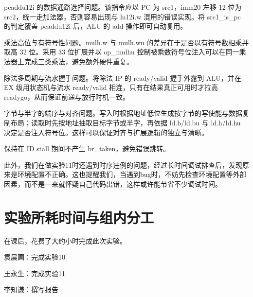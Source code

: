 \documentclass[11pt]{article}
\begin{document}
pcaddu12i 的数据通路选择问题。该指令应以 PC 为 src1，imm20 左移 12 位为 src2，统一走加法器，否则容易出现与 lu12i.w 混用的错误实现。将 src1\_is\_pc 的判定覆盖 pcaddu12i 后，ALU 的 add 操作即可自动复用。

乘法高位与有符号性问题。mulh.w 与 mulh.wu 的差异在于是否以有符号数相乘并取高 32 位。采用 33 位扩展并以 op\_mulhu 控制被乘数符号位注入可以在同一乘法器上完成三类乘法，避免额外硬件重复。

除法多周期与流水握手问题。将除法 IP 的 ready/valid 握手外露到 ALU，并在 EX 级用状态机与流水 ready/valid 相连，只有在结果真正可用时才拉高 readygo，从而保证前递与放行时机一致。

字节与半字的端序与对齐问题。写入时根据地址低位生成按字节的写使能与数据复制布局；读取时先按地址抽取目标字节或半字，再依据 ld.b/ld.bu 与 ld.h/ld.hu 决定是否注入符号位。这样可以保证对齐与扩展逻辑的独立与清晰。

保持在 ID stall 期间不产生 br\_taken，避免错误跳转。

此外，我们在做实验11时还遇到时序违例的问题，经过长时间调试排查后，发现原来是环境配置不正确。这也提醒我们，当遇到bug时，不妨先检查环境配置等外部因素，而不是一来就怀疑自己代码出错，这样或许能节省不少调试时间。

\section{实验所耗时间与组内分工}

\newcommand{\labTime}{15}

在课后，花费了大约\underline{\makebox[5em][c]{\labTime}}小时完成此次实验。

袁晨圃：完成实验10

王永生：完成实验11

李知谦：撰写报告
\end{document}
